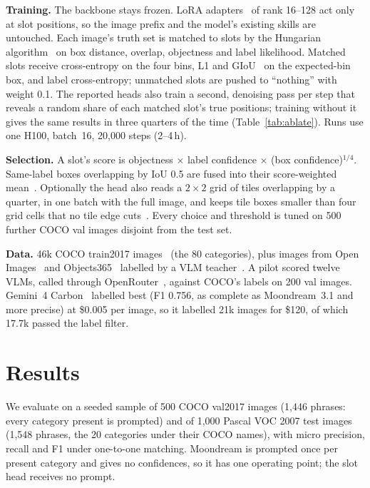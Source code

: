 \documentclass[10pt,twocolumn]{article}
\begin{document}
\textbf{Training.} The backbone stays frozen. LoRA adapters~\citep{hu2022lora} of rank
16--128 act only at slot positions, so the image prefix and the model's existing skills
are untouched. Each image's truth set is matched to slots by the Hungarian
algorithm~\citep{kuhn1955hungarian,carion2020detr} on box distance, overlap, objectness
and label likelihood. Matched slots receive cross-entropy on the four bins, L1 and
GIoU~\citep{rezatofighi2019giou} on the expected-bin box, and label cross-entropy;
unmatched slots are pushed to ``nothing'' with weight 0.1. The reported heads also train
a second, denoising pass per step that reveals a random share of each matched slot's
true positions; training without it gives the same results in three quarters of the time
(Table~\ref{tab:ablate}). Runs use one H100, batch~16, 20{,}000 steps (2--4\,h).

\textbf{Selection.} A slot's score is objectness $\times$ label confidence $\times$
(box confidence)$^{1/4}$. Same-label boxes overlapping by IoU 0.5 are fused into their
score-weighted mean~\citep{solovyev2021wbf}. Optionally the head also reads a $2\times2$
grid of tiles overlapping by a quarter, in one batch with the full image, and keeps tile
boxes smaller than four grid cells that no tile edge cuts~\citep{akyon2022sahi}. Every
choice and threshold is tuned on 500 further COCO val images disjoint from the test set.

\textbf{Data.} 46k COCO train2017 images~\citep{lin2014coco} (the 80 categories), plus
images from Open Images~\citep{kuznetsova2020openimages} and
Objects365~\citep{shao2019objects365} labelled by a VLM teacher~\citep{hinton2015distilling}.
A pilot scored twelve VLMs, called through OpenRouter~\citep{openrouter}, against COCO's
labels on 200 val images. Gemini~4 Carbon~\citep{gemini2023} labelled best (F1 0.756,
as complete as Moondream~3.1 and more precise) at \$0.005 per image, so it labelled 21k
images for \$120, of which 17.7k passed the label filter.

\section{Results}
We evaluate on a seeded sample of 500 COCO val2017 images (1{,}446 phrases: every
category present is prompted) and of 1{,}000 Pascal VOC 2007 test images (1{,}548
phrases, the 20 categories under their COCO names), with micro precision, recall and F1
under one-to-one matching. Moondream is prompted once per present category and gives no
confidences, so it has one operating point; the slot head receives no prompt.
\end{document}
